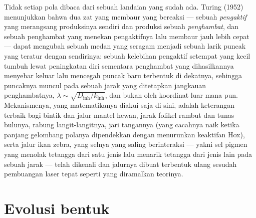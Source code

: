 \begin{proposition}\label{prop:b3:developmental-genetics:turing}
Tidak setiap pola dibaca dari sebuah landaian yang sudah ada. Turing (1952)
menunjukkan bahwa dua zat yang membaur yang bereaksi --- sebuah \emph{pengaktif}
yang merangsang produksinya sendiri dan produksi sebuah \emph{penghambat},
dan sebuah penghambat yang menekan pengaktifnya lalu membaur jauh
lebih cepat --- dapat mengubah sebuah medan yang seragam menjadi sebuah larik puncak yang teratur
dengan sendirinya: sebuah kelebihan pengaktif setempat yang kecil tumbuh lewat
peningkatan diri sementara penghambat yang dihasilkannya menyebar keluar lalu
mencegah puncak baru terbentuk di dekatnya, sehingga puncaknya muncul pada sebuah jarak yang ditetapkan
jangkauan penghambatnya, $\lambda \sim \sqrt{D_{\text{inh}}/k_{\text{inh}}}$,
dan bukan oleh koordinat luar mana pun. Mekanismenya, yang matematikanya
diakui saja di sini, adalah keterangan terbaik bagi bintik dan jalur mantel
hewan, jarak folikel rambut dan tunas bulunya, rabung
langit-langitnya, jari tangannya (yang cacahnya naik ketika
panjang gelombang polanya dipendekkan dengan menurunkan keaktifan Hox), serta
jalur ikan zebra, yang selnya yang saling berinteraksi --- yakni sel pigmen
yang menolak tetangga dari satu jenis lalu menarik tetangga dari jenis lain pada sebuah
jarak --- telah dikenali dan jalurnya dibuat terbentuk ulang
sesudah pembuangan laser tepat seperti yang diramalkan teorinya.
\end{proposition}
\admitted

\section{Evolusi bentuk}

